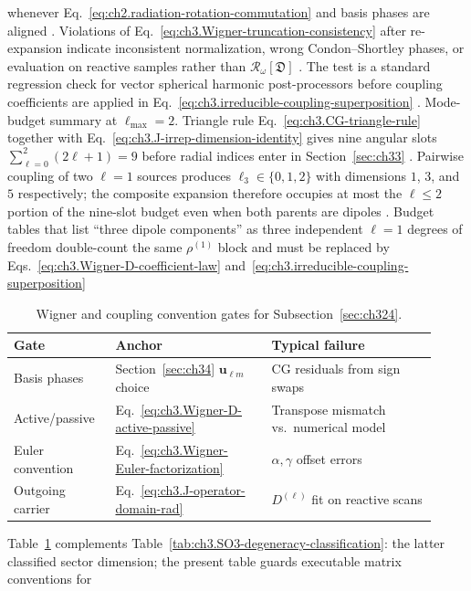 whenever Eq.~\eqref{eq:ch2.radiation-rotation-commutation} and basis phases are aligned
. Violations of Eq.~\eqref{eq:ch3.Wigner-truncation-consistency} after
re-expansion indicate inconsistent normalization, wrong Condon--Shortley phases, or evaluation on reactive
samples rather than \(\mathcal{R}_\omega[\mathfrak{D}]\) . The test is a
standard regression check for vector spherical harmonic post-processors before coupling coefficients are applied
in Eq.~\eqref{eq:ch3.irreducible-coupling-superposition} .
Mode-budget summary at \(\ell_{\max}=2\). Triangle rule Eq.~\eqref{eq:ch3.CG-triangle-rule} together with
Eq.~\eqref{eq:ch3.J-irrep-dimension-identity} gives nine angular slots
\(\sum_{\ell=0}^{2}(2\ell+1)=9\) before radial indices enter in Section~\ref{sec:ch33}
. Pairwise coupling of two \(\ell=1\) sources produces \(\ell_3\in\{0,1,2\}\) with
dimensions \(1\), \(3\), and \(5\) respectively; the composite expansion therefore occupies at most the
\(\ell\le2\) portion of the nine-slot budget even when both parents are dipoles
. Budget tables that list ``three dipole components'' as three
independent \(\ell=1\) degrees of freedom double-count the same \(\rho^{(1)}\) block and must be replaced by
Eqs.~\eqref{eq:ch3.Wigner-D-coefficient-law} and~\eqref{eq:ch3.irreducible-coupling-superposition}
\begin{table}[t]
\centering
\caption{Wigner and coupling convention gates for Subsection~\ref{sec:ch324}.}
\label{tab:ch3.Wigner-convention-gates}
\small
\begin{tabular}{@{}p{0.22\linewidth}p{0.34\linewidth}p{0.36\linewidth}@{}}
\toprule
Gate & Anchor & Typical failure \\
\midrule
Basis phases &
Section~\ref{sec:ch34} \(\mathbf{u}_{\ell m}\) choice &
CG residuals from sign swaps \\
\addlinespace
Active/passive &
Eq.~\eqref{eq:ch3.Wigner-D-active-passive} &
Transpose mismatch vs.\ numerical model \\
\addlinespace
Euler convention &
Eq.~\eqref{eq:ch3.Wigner-Euler-factorization} &
\(\alpha,\gamma\) offset errors \\
\addlinespace
Outgoing carrier &
Eq.~\eqref{eq:ch3.J-operator-domain-rad} &
\(D^{(\ell)}\) fit on reactive scans \\
\bottomrule
\end{tabular}
\end{table}
Table~\ref{tab:ch3.Wigner-convention-gates} complements Table~\ref{tab:ch3.SO3-degeneracy-classification}:
the latter classified sector dimension; the present table guards executable matrix conventions for
